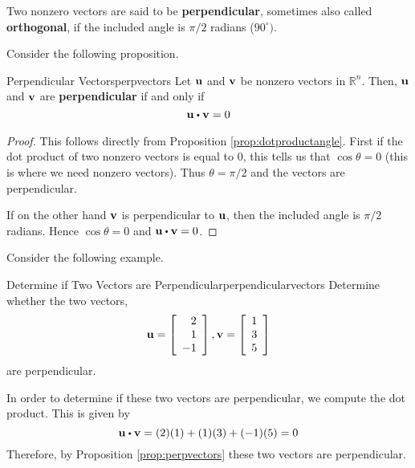 Two nonzero  vectors are said to be \textbf{perpendicular}, sometimes also called \textbf{orthogonal}, if
the included angle is $\pi /2$ radians ($90^{\circ }).$

Consider the following proposition.

\begin{proposition}{Perpendicular Vectors}{perpvectors}
Let ${\bf u}$ and ${\bf v}$ be nonzero vectors in $\mathbb{R}^n$. Then, 
${\bf u}$ and ${\bf v}$ are \textbf{perpendicular} if and only if
\begin{equation*}
\vect{u}
\dotprod
\vect{v}
=
0
\end{equation*}
\end{proposition}

\begin{proof}
This follows directly from Proposition \ref{prop:dotproductangle}. First if the dot product of
two nonzero vectors is equal to $0$, this tells us that $\cos \theta
=0$ (this is where we need nonzero vectors). Thus $\theta = \pi /2$
and the vectors are perpendicular.

If on the other hand ${\bf v}$ is perpendicular to ${\bf u}$, then 
the included angle is $\pi /2$ radians. Hence $\cos \theta =0$ and 
$\vect{u} \dotprod \vect{v} = 0$.
\end{proof}

Consider the following example.

\begin{example}{Determine if Two Vectors are Perpendicular}{perpendicularvectors}
Determine whether the two vectors, 
\begin{equation*}
{\bf u}=
\left[
\begin{array}{r}
2 \\
1 \\
-1 
\end{array}
\right], 
{\bf v} 
=
\left[
\begin{array}{r}
1 \\
3 \\
5
\end{array}
\right]
\end{equation*}
 are perpendicular.
\end{example}

\begin{solution}
In order to determine if these two vectors are perpendicular, we compute the dot product.
This is given by
\begin{equation*}
\vect{u} \dotprod \vect{v}
=
(2)(1) + (1)(3) + (-1)(5)
=
0
\end{equation*}
Therefore, by Proposition \ref{prop:perpvectors} these two vectors are perpendicular.
\end{solution}
